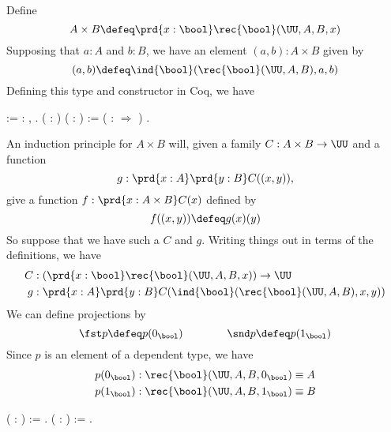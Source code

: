 \soln 
    Define
    \[
    A \times B \defeq \prd{x : \bool} \rec{\bool}(\UU, A, B, x)
    \]
    Supposing that $a : A$ and $b : B$, we have an element $(a, b) : A \times B$
    given by
    \[
    (a, b) \defeq \ind{\bool}(\rec{\bool}(\UU, A, B), a, b)
    \]
    Defining this type and constructor in Coq, we have \begin{coqdoccode}
\coqdocemptyline
\coqdocindent{1.00em}
  := \coqdockw{\ensuremath{\forall}}  : ,      .\coqdoceol
\coqdocemptyline
\coqdocindent{1.00em}
  ( : ) ( : ) :=  (  :  \ensuremath{\Rightarrow}      )  .\coqdoceol
\coqdocemptyline
\end{coqdoccode}


    An induction principle for $A \times B$ will, given a family $C : A \times B
    \to \UU$ and a function 
    \[
    g : \prd{x:A}\prd{y:B} C((x, y)),
    \] 
    give a function $f : \prd{x : A \times B}C(x)$ defined by
    \[
    f((x, y)) \defeq g(x)(y)
    \]
    So suppose that we have such a $C$ and $g$.  Writing things out in terms of the
    definitions, we have
    \begin{align*}
    C &: \left(\prd{x:\bool}\rec{\bool}(\UU, A, B, x)\right) \to \UU \\
    g &: \prd{x:A}\prd{y:B} C(\ind{\bool}(\rec{\bool}(\UU, A, B), x, y))
    \end{align*}  
    We can define projections by
    \[
    \fst p \defeq p(0_{\bool}) \qquad\qquad \snd p \defeq p(1_{\bool})
    \]
    Since $p$ is an element of a dependent type, we have
    \begin{align*}
    p(0_{\bool}) &: \rec{\bool}(\UU, A, B, 0_{\bool}) \equiv A\\
    p(1_{\bool}) &: \rec{\bool}(\UU, A, B, 1_{\bool}) \equiv B
    \end{align*} \begin{coqdoccode}
\coqdocemptyline
\coqdocindent{1.00em}
  ( : ) :=  .\coqdoceol
\coqdocemptyline
\coqdocindent{1.00em}
  ( : ) :=  .\coqdoceol
\coqdocemptyline
\end{coqdoccode}


